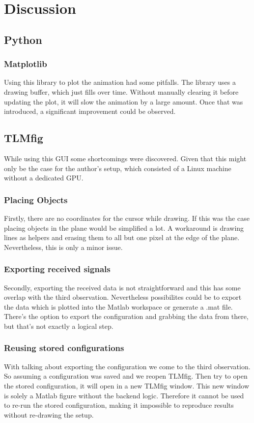 \documentclass[twocolumn]{article}
\begin{document}
\section{Discussion}

\subsection{Python}
\subsubsection{Matplotlib}
Using this library to plot the animation had some pitfalls.
The library uses a drawing buffer, which just fills over time.
Without manually clearing it before updating the plot, it will slow
the animation by a large amount.
Once that was introduced, a significant improvement could be observed.

\subsection{TLMfig}
While using this GUI some shortcomings were discovered.
Given that this might only be the case for the author's setup, which consisted
of a Linux machine without a dedicated GPU.

\subsubsection{Placing Objects}
Firstly, there are no coordinates for the cursor while drawing.
If this was the case placing objects in the plane would be simplified a lot.
A workaround is drawing lines as helpers and erasing them to all but one pixel
at the edge of the plane.
Nevertheless, this is only a minor issue.

\subsubsection{Exporting received signals}
Secondly, exporting the received data is not straightforward and this has some
overlap with the third observation.
Nevertheless possibilites could be to export the data which is plotted into the
Matlab workspace or generate a .mat file.
There's the option to export the configuration and grabbing the data from there,
but that's not exactly a logical step.

\subsubsection{Reusing stored configurations}
With talking about exporting the configuration we come to the third observation.
So assuming a configuration was saved and we reopen TLMfig.
Then try to open the stored configuration, it will open in a new TLMfig window.
This new window is solely a Matlab figure without the backend logic.
Therefore it cannot be used to re-run the stored configuration, making it impossible
to reproduce results without re-drawing the setup.
\end{document}
